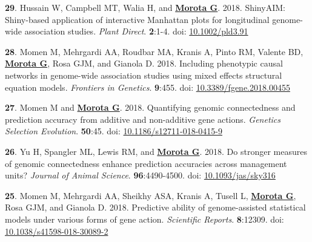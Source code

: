 \documentclass[margin,line,10pt]{res}
\newenvironment{list1}{
  \begin{list}{\ding{113}}{%
      \setlength{\itemsep}{0in}
      \setlength{\parsep}{0in} \setlength{\parskip}{0in}
      \setlength{\topsep}{0in} \setlength{\partopsep}{0in} 
      \setlength{\leftmargin}{0.17in}}}{\end{list}}
\begin{document}
\begin{resume}
\begin{list1}
\item  [{\bf 29}.]  Hussain W, Campbell MT, Walia H, and \textbf{\underline{Morota G}}. 2018. ShinyAIM: Shiny-based application of interactive Manhattan plots for longitudinal genome-wide association studies. \emph{Plant Direct}. \textbf{2}:1-4. doi: \textcolor{blue}{\href{https://doi.org/10.1002/pld3.91}{10.1002/pld3.91}}

   \vspace{0.5cm}
  
\item  [{\bf 28}.] Momen M, Mehrgardi AA, Roudbar MA, Kranis A, Pinto RM, Valente BD, \textbf{\underline{Morota G}}, Rosa GJM, and Gianola D. 2018. Including phenotypic causal networks in genome-wide association studies using mixed effects structural equation models. \emph{Frontiers in Genetics}. \textbf{9}:455. doi: \textcolor{blue}{\href{https://doi.org/10.3389/fgene.2018.00455}{10.3389/fgene.2018.00455}}

  \vspace{0.5cm}
  
\item  [{\bf 27}.] Momen M and  \textbf{\underline{Morota G}}. 2018. Quantifying genomic connectedness and prediction accuracy from additive and non-additive gene actions. \emph{Genetics Selection Evolution}. \textbf{50}:45. doi: \textcolor{blue}{\href{https://doi.org/10.1186/s12711-018-0415-9}{10.1186/s12711-018-0415-9}}

  \vspace{0.5cm}
  
\item  [{\bf 26}.] Yu H, Spangler ML, Lewis RM, and {\bf \underline{Morota G}}. 2018.  Do stronger measures of genomic connectedness enhance prediction accuracies across management units? \emph{Journal of Animal Science}. \textbf{96}:4490-4500.  doi: \textcolor{blue}{\href{https://doi.org/10.1093/jas/sky316}{10.1093/jas/sky316}} 

  \vspace{0.5cm}

\item  [{\bf 25}.] Momen M, Mehrgardi AA, Sheikhy ASA, Kranis A, Tusell L, \textbf{\underline{Morota G}}, Rosa GJM, and Gianola D. 2018. Predictive ability of genome-assisted statistical models under various forms of gene action. \emph{Scientific Reports}. \textbf{8}:12309. doi: \textcolor{blue}{\href{https://doi.org/10.1038/s41598-018-30089-2}{10.1038/s41598-018-30089-2}} 

  \vspace{0.5cm}


\end{list1}
\end{resume}
\end{document}
